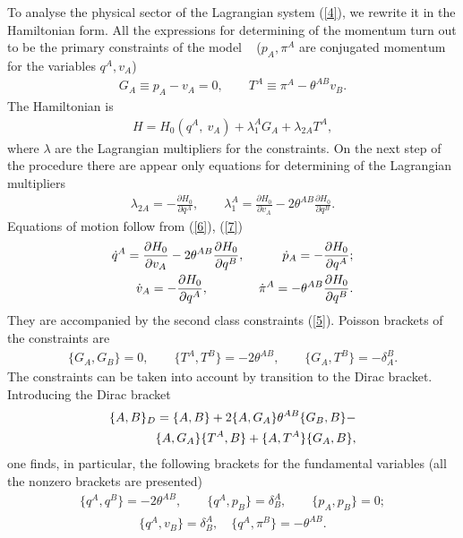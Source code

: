 \documentclass[paper a4]{article}
\begin{document}
To analyse the physical sector of the Lagrangian system (\ref{4}),
we rewrite it in the Hamiltonian form. All the expressions for determining
of the momentum turn out to be the primary constraints of the model ~
($p_A,  \pi^A$ are conjugated momentum for the variables $q^A,  v_A$)
\begin{eqnarray}\label{5}
G_A\equiv p_A-v_A=0, \qquad
T^A\equiv\pi^A-\theta^{AB}v_B.
\end{eqnarray}
The Hamiltonian is
\begin{eqnarray}\label{6}
H=H_0(q^A, ~ v_A)+\lambda_{1}^AG_A+\lambda_{2A}T^A,
\end{eqnarray}
where $\lambda$ are the
Lagrangian multipliers for the constraints. On the next step of the
procedure there are appear only equations for determining of the Lagrangian
multipliers
\begin{eqnarray}\label{7}
\lambda_{2A}=-\frac{\partial H_0}{\partial q^A}, \qquad
\lambda_1^A=\frac{\partial H_0}{\partial v_A}-2\theta^{AB}
\frac{\partial H_0}{\partial q^B}.
\end{eqnarray}
Equations of motion follow from (\ref{6}), (\ref{7})
\begin{eqnarray}\label{8}
\dot q^A=\frac{\partial H_0}{\partial v_A}-2\theta^{AB}
\frac{\partial H_0}{\partial q^B}, \quad
\qquad \dot p_A=-\frac{\partial H_0}{\partial q^A}; \cr
\dot v_A=-\frac{\partial H_0}{\partial q^A}, \quad \quad
\qquad \dot \pi^A=-\theta^{AB}\frac{\partial H_0}{\partial q^B}.
\end{eqnarray}
They are accompanied by the second class constraints (\ref{5}).
Poisson brackets of the constraints are
\begin{eqnarray}\label{9}
\{G_A, G_B\}=0, \qquad \{T^A, T^B\}=
-2\theta^{AB}, \qquad
\{G_A, T^B\}=-\delta_A^B.
\end{eqnarray}
The constraints can be taken into account by transition to the Dirac
bracket. Introducing the Dirac bracket
\begin{eqnarray}\label{10}
\{A, B\}_D=\{A, B\}+2\{A, G_A\}\theta^{AB}
\{G_B, B\}- \cr
\{A, G_A\}\{T^A, B\}+\{A, T^A\}\{G_A, B\},
\end{eqnarray}
one finds, in particular, the following brackets for the
fundamental variables (all the nonzero brackets are presented)
\begin{eqnarray}\label{11}
\{q^A, q^B\}=-2\theta^{AB}, \qquad
\{q^A, p_B\}=\delta^A_B,
\qquad \{p_A, p_B\}=0;
\end{eqnarray}
\begin{eqnarray}\label{12}
\{q^A, v_B\}=\delta^A_B, \quad
\{q^A, \pi^B\}=-\theta^{AB}.
\end{eqnarray}
\end{document}
